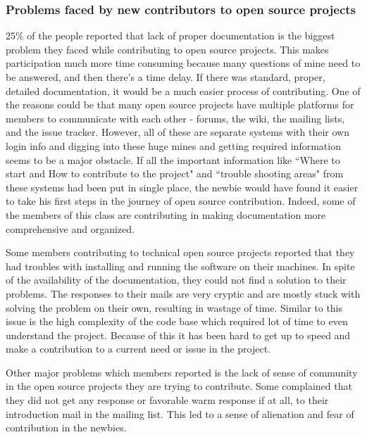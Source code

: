 \subsubsection{Problems faced by new contributors to open source projects}
25\% of the people reported that lack of proper documentation is the biggest problem they faced while contributing to open source projects. This makes participation much more time consuming because many questions of mine need to be answered, and then there's a time delay. If there was standard, proper, detailed documentation, it would be a much easier process of contributing. One of the reasons could be  that many open source projects have multiple platforms for members to communicate with each other - forums, the wiki, the mailing lists, and the issue tracker. However, all of these are separate systems with their own login info and digging into these huge mines and getting required information seems to be a major obstacle. If all the important information like ``Where to start and How to contribute to the project" and ``trouble shooting areas" from these systems had been put in single place, the newbie would have found it easier to take his first steps in the journey of open source contribution. Indeed, some of the members of this class are contributing in making documentation more comprehensive and organized.

Some members contributing to technical open source projects reported that they had troubles with installing and running the software on their machines. In spite of the availability of the documentation, they could not find a solution to their problems. The responses to their mails are very cryptic and are mostly stuck with solving the problem on their own, resulting in wastage of time. Similar to this issue is the high complexity of the code base which required lot of time to even understand the project. Because of this it has been hard to get up to speed and make a contribution to a current need or issue in the project.

Other major problems which members reported is the lack of sense of community in the open source projects they are trying to contribute. Some complained that they did not get any response or favorable warm response if at all, to their introduction mail in the mailing list. This led to a sense of alienation and fear of contribution in the newbies. 

